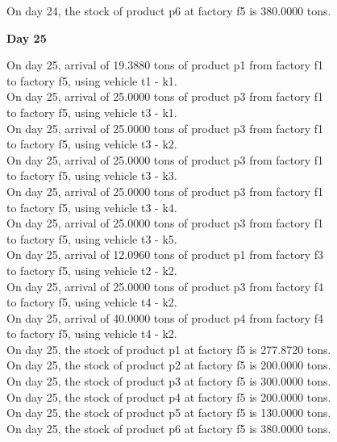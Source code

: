 \begin{table}[H]
\begin{multicols}{2}
\begin{tabbing}
On day 24, the stock of product p6 at factory f5 is 380.0000 tons. \\
\end{tabbing} \vspace{-2.0em}
\textbf{Day 25}
\vspace{-1.6em}
\begin{tabbing}
On day 25, arrival of 19.3880 tons of product p1 from factory f1 \\ to factory f5, using vehicle t1 - k1. \\
On day 25, arrival of 25.0000 tons of product p3 from factory f1 \\ to factory f5, using vehicle t3 - k1. \\
On day 25, arrival of 25.0000 tons of product p3 from factory f1 \\ to factory f5, using vehicle t3 - k2. \\
On day 25, arrival of 25.0000 tons of product p3 from factory f1 \\ to factory f5, using vehicle t3 - k3. \\
On day 25, arrival of 25.0000 tons of product p3 from factory f1 \\ to factory f5, using vehicle t3 - k4. \\
On day 25, arrival of 25.0000 tons of product p3 from factory f1 \\ to factory f5, using vehicle t3 - k5. \\
On day 25, arrival of 12.0960 tons of product p1 from factory f3 \\ to factory f5, using vehicle t2 - k2. \\
On day 25, arrival of 25.0000 tons of product p3 from factory f4 \\ to factory f5, using vehicle t4 - k2. \\
On day 25, arrival of 40.0000 tons of product p4 from factory f4 \\ to factory f5, using vehicle t4 - k2. \\
On day 25, the stock of product p1 at factory f5 is 277.8720 tons. \\
On day 25, the stock of product p2 at factory f5 is 200.0000 tons. \\
On day 25, the stock of product p3 at factory f5 is 300.0000 tons. \\
On day 25, the stock of product p4 at factory f5 is 200.0000 tons. \\
On day 25, the stock of product p5 at factory f5 is 130.0000 tons. \\
On day 25, the stock of product p6 at factory f5 is 380.0000 tons. \\

\end{tabbing}
\end{multicols}
\end{table}
